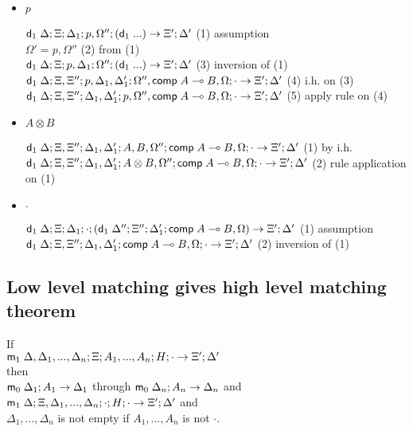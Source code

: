 \begin{itemize}
\item $p$

$\mathsf{d}_1 \; \Delta; \Xi; \Delta_1; p, \Omega''; (\mathsf{d}_1 \; ...) \rightarrow \Xi'; \Delta'$ \hfill (1) assumption \\
$\Omega' = p, \Omega''$ \hfill (2) from (1) \\
$\mathsf{d}_1 \; \Delta; \Xi; p, \Delta_1; \Omega''; (\mathsf{d}_1 \; ...) \rightarrow \Xi'; \Delta'$ \hfill (3) inversion of (1) \\
$\mathsf{d}_1 \; \Delta; \Xi, \Xi''; p, \Delta_1, \Delta'_1; \Omega'', \mathsf{comp} \; A \multimap B, \Omega; \cdot \rightarrow \Xi'; \Delta'$ \hfill (4) i.h. on (3) \\
$\mathsf{d}_1 \; \Delta; \Xi, \Xi''; \Delta_1, \Delta'_1; p, \Omega'', \mathsf{comp} \; A \multimap B, \Omega; \cdot \rightarrow \Xi'; \Delta'$ \hfill (5) apply rule on (4) \\

\item $A \otimes B$

$\mathsf{d}_1 \; \Delta; \Xi, \Xi''; \Delta_1, \Delta'_1; A, B, \Omega''; \mathsf{comp} \; A \multimap B, \Omega; \cdot \rightarrow \Xi'; \Delta'$ \hfill (1) by i.h. \\
$\mathsf{d}_1 \; \Delta; \Xi, \Xi''; \Delta_1, \Delta'_1; A \otimes B, \Omega''; \mathsf{comp} \; A \multimap B, \Omega; \cdot \rightarrow \Xi'; \Delta'$ \hfill (2) rule application on (1) \\

\item $\cdot$

$\mathsf{d}_1 \; \Delta; \Xi; \Delta_1; \cdot; (\mathsf{d}_1 \; \Delta''; \Xi''; \Delta'_1; \mathsf{comp} \; A \multimap B, \Omega) \rightarrow \Xi'; \Delta'$ \hfill (1) assumption \\
$\mathsf{d}_1 \; \Delta; \Xi, \Xi''; \Delta_1, \Delta'_1; \mathsf{comp} \; A \multimap B, \Omega; \cdot \rightarrow \Xi'; \Delta'$ \hfill (2) inversion of (1) \\

\end{itemize}

\subsection{Low level matching gives high level matching theorem}

If \\
$\mathsf{m}_1 \; \Delta, \Delta_1, ..., \Delta_n; \Xi; A_1, ..., A_n; H; \cdot \rightarrow \Xi'; \Delta'$ \\
then \\
$\mathsf{m}_0 \; \Delta_1; A_1 \rightarrow \Delta_1$ through $\mathsf{m}_0 \; \Delta_n; A_n \rightarrow \Delta_n$ and \\
$\mathsf{m}_1 \; \Delta; \Xi, \Delta_1, ..., \Delta_n; \cdot; H; \cdot \rightarrow \Xi'; \Delta'$ and \\
$\Delta_1, ..., \Delta_n$ is not empty if $A_1, ..., A_n$ is not $\cdot$.

